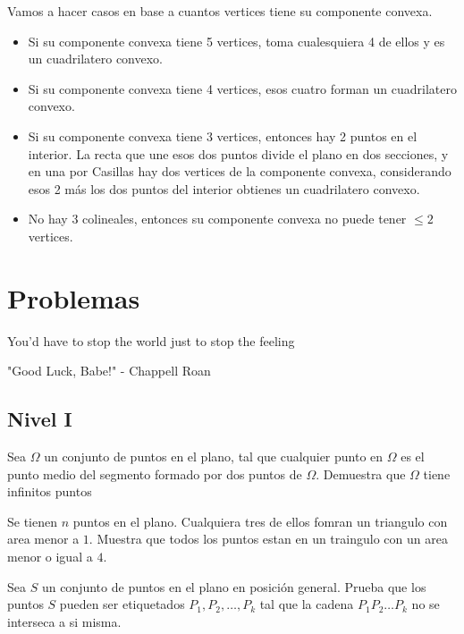 \documentclass[11pt]{scrartcl}
\begin{document}
\begin{soln}
Vamos a hacer casos en base a cuantos vertices tiene su componente convexa. 
\begin{itemize}
    \item Si su componente convexa tiene 5 vertices, toma cualesquiera 4 de ellos y es un cuadrilatero convexo. 
    \item Si su componente convexa tiene 4 vertices, esos cuatro forman un cuadrilatero convexo.
    \item Si su componente convexa tiene 3 vertices, entonces hay 2 puntos en el interior. La recta que une esos dos puntos divide el plano en dos secciones, y en una por Casillas hay dos vertices de la componente convexa, considerando esos 2 más los dos puntos del interior obtienes un cuadrilatero convexo.
    \item No hay 3 colineales, entonces su componente convexa no puede tener $\leq 2$ vertices.
\end{itemize}
\end{soln}
\newpage
\section{Problemas}
\epigraph{You'd have to stop the world just to stop the feeling}{"Good Luck, Babe!" - Chappell Roan }

\subsection{Nivel I}
\begin{problem}
 Sea $\Omega$ un conjunto de puntos en el plano, tal que cualquier punto en $\Omega$ es el punto medio del segmento formado por dos puntos de $\Omega$. Demuestra que $\Omega$ tiene infinitos puntos
\end{problem}

\begin{problem} 
    Se tienen $n$ puntos en el plano. Cualquiera tres de ellos fomran un triangulo con area menor a $1$. Muestra que todos los puntos estan en un traingulo con un area menor o igual a $4$.
\end{problem}

\begin{problem}
Sea $S$ un conjunto de puntos en el plano en posición general. Prueba que los puntos $S$ pueden ser etiquetados $P_1,P_2, \ldots, P_k$ tal que la cadena $P_1P_2\ldots P_k$ no se interseca a si misma.
\end{problem}
\end{document}
